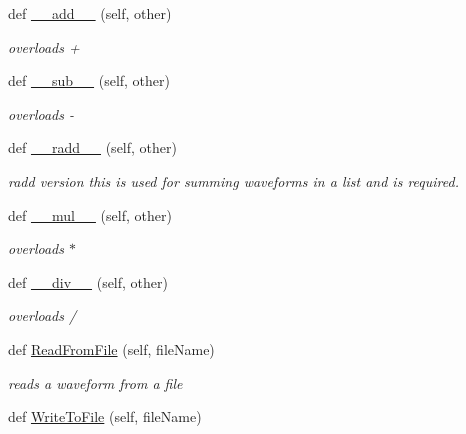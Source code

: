 \begin{DoxyCompactItemize}
def \hyperlink{classSignalIntegrity_1_1TimeDomain_1_1Waveform_1_1Waveform_1_1Waveform_a547cf97e438ebc6734fd6d1ea2b21b6d}{\+\_\+\+\_\+add\+\_\+\+\_\+} (self, other)
\begin{DoxyCompactList}\small\item\em overloads + \end{DoxyCompactList}\item 
def \hyperlink{classSignalIntegrity_1_1TimeDomain_1_1Waveform_1_1Waveform_1_1Waveform_ae03b88268c88fb1edfdb3f5353478d7b}{\+\_\+\+\_\+sub\+\_\+\+\_\+} (self, other)
\begin{DoxyCompactList}\small\item\em overloads -\/ \end{DoxyCompactList}\item 
def \hyperlink{classSignalIntegrity_1_1TimeDomain_1_1Waveform_1_1Waveform_1_1Waveform_a2e098fa2cfaf8d1874cf417836a3329e}{\+\_\+\+\_\+radd\+\_\+\+\_\+} (self, other)
\begin{DoxyCompactList}\small\item\em radd version this is used for summing waveforms in a list and is required. \end{DoxyCompactList}\item 
def \hyperlink{classSignalIntegrity_1_1TimeDomain_1_1Waveform_1_1Waveform_1_1Waveform_a96fd98a8997501189d60829abc0257cb}{\+\_\+\+\_\+mul\+\_\+\+\_\+} (self, other)
\begin{DoxyCompactList}\small\item\em overloads $\ast$ \end{DoxyCompactList}\item 
def \hyperlink{classSignalIntegrity_1_1TimeDomain_1_1Waveform_1_1Waveform_1_1Waveform_afeae6ad6a777e389fe51032a0fd81882}{\+\_\+\+\_\+div\+\_\+\+\_\+} (self, other)
\begin{DoxyCompactList}\small\item\em overloads / \end{DoxyCompactList}\item 
def \hyperlink{classSignalIntegrity_1_1TimeDomain_1_1Waveform_1_1Waveform_1_1Waveform_af1bc3f4d93eb8bdf97d312b495a7689d}{Read\+From\+File} (self, file\+Name)
\begin{DoxyCompactList}\small\item\em reads a waveform from a file \end{DoxyCompactList}\item 
def \hyperlink{classSignalIntegrity_1_1TimeDomain_1_1Waveform_1_1Waveform_1_1Waveform_a9bc60dff701312ba7ddf47ee941bbc8f}{Write\+To\+File} (self, file\+Name)

\end{DoxyCompactItemize}

